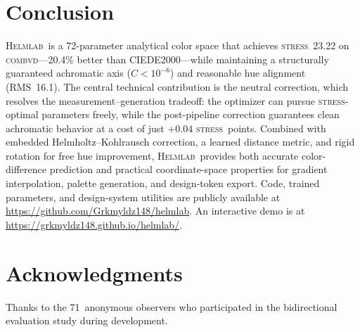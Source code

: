 \documentclass[11pt, twocolumn]{article}
\newcommand{\helmlab}{\textsc{Helmlab}}
\newcommand{\stress}{\textsc{stress}}
\newcommand{\combvd}{\textsc{combvd}}
\begin{document}
\section{Conclusion}
\label{sec:conclusion}

\helmlab\ is a 72-parameter analytical color space that achieves
\stress\ 23.22 on \combvd---20.4\% better than CIEDE2000---while
maintaining a structurally guaranteed achromatic axis ($C < 10^{-6}$)
and reasonable hue alignment (RMS~16.1\textdegree). The central
technical contribution is the neutral correction, which resolves the
measurement--generation tradeoff: the optimizer can pursue
\stress-optimal parameters freely, while the post-pipeline correction
guarantees clean achromatic behavior at a cost of just $+0.04$
\stress\ points. Combined with embedded Helmholtz--Kohlrausch
correction, a learned distance metric, and rigid rotation for
free hue improvement, \helmlab\ provides both accurate color-difference
prediction and practical coordinate-space properties for gradient
interpolation, palette generation, and design-token export.
Code, trained parameters, and design-system utilities are publicly
available at \url{https://github.com/Grkmyldz148/helmlab}. An
interactive demo is at \url{https://grkmyldz148.github.io/helmlab/}.


\section*{Acknowledgments}

Thanks to the 71~anonymous observers who participated in the
bidirectional evaluation study during development.
\end{document}
